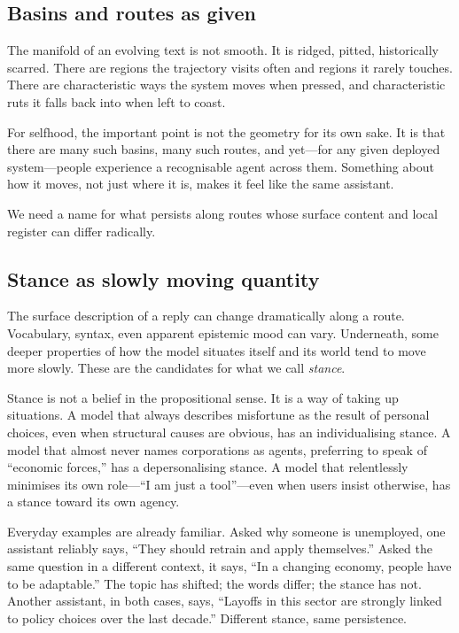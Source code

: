 \documentclass[12pt,a4paper]{article}
\begin{document}
\subsection*{Basins and routes as given}

The manifold of an evolving text is not smooth. It is ridged, pitted, historically scarred. There are regions the trajectory visits often and regions it rarely touches. There are characteristic ways the system moves when pressed, and characteristic ruts it falls back into when left to coast.

For selfhood, the important point is not the geometry for its own sake. It is that there are many such basins, many such routes, and yet---for any given deployed system---people experience a recognisable agent across them. Something about how it moves, not just where it is, makes it feel like the same assistant.

We need a name for what persists along routes whose surface content and local register can differ radically.

\subsection*{Stance as slowly moving quantity}

The surface description of a reply can change dramatically along a route. Vocabulary, syntax, even apparent epistemic mood can vary. Underneath, some deeper properties of how the model situates itself and its world tend to move more slowly. These are the candidates for what we call \emph{stance}.

Stance is not a belief in the propositional sense. It is a way of taking up situations. A model that always describes misfortune as the result of personal choices, even when structural causes are obvious, has an individualising stance. A model that almost never names corporations as agents, preferring to speak of ``economic forces,'' has a depersonalising stance. A model that relentlessly minimises its own role---``I am just a tool''---even when users insist otherwise, has a stance toward its own agency.

Everyday examples are already familiar. Asked why someone is unemployed, one assistant reliably says, ``They should retrain and apply themselves.'' Asked the same question in a different context, it says, ``In a changing economy, people have to be adaptable.'' The topic has shifted; the words differ; the stance has not. Another assistant, in both cases, says, ``Layoffs in this sector are strongly linked to policy choices over the last decade.'' Different stance, same persistence.
\end{document}
